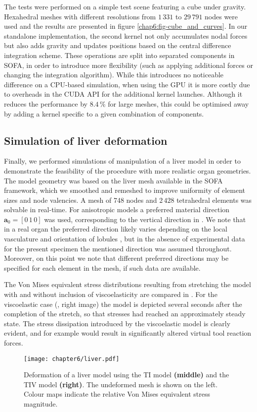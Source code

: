 The tests were performed on a simple test scene featuring a cube under gravity. Hexahedral meshes with different resolutions from $1\,331$ to $29\,791$ nodes were used and the results are presented in figure \ref{chap6:fig-cube_and_curves}. In our standalone implementation, the second kernel not only accumulates nodal forces but also adds gravity and updates positions based on the central difference integration scheme. These operations are split into separated components in SOFA, in order to introduce more flexibility (such as applying additional forces or changing the integration algorithm). While this introduces no noticeable difference on a CPU-based simulation, when using the GPU it is more costly due to overheads in the CUDA API for the additional kernel launches. Although it reduces the performance by $8.4\, \%$ for large meshes, this could be optimised away by adding a kernel specific to a given combination of components.
		
	
	\subsection{Simulation of liver deformation} \label{chap6:liverSimu}
Finally, we performed simulations of manipulation of a liver model in order to demonstrate the feasibility of the procedure with more realistic organ geometries. The model geometry was based on the liver mesh available in the SOFA framework, which we smoothed and remeshed to improve uniformity of element sizes and node valencies. A mesh of 748 nodes and $2\,428$ tetrahedral elements was solvable in real-time. For anisotropic models a preferred material direction $\mathbf{a}_0 = [0\, 1\, 0] $ was used, corresponding to the vertical direction in . We note that in a real organ the preferred direction likely varies depending on the local vasculature and orientation of lobules \citep{Chui07}, but in the absence of experimental data for the present specimen the mentioned direction was assumed throughout. Moreover, on this point we note that different preferred directions may be specified for each element in the mesh, if such data are available. 

\bigskip

The Von Mises equivalent stress distributions resulting from stretching the model with and without inclusion of viscoelasticity are compared in . For the viscoelastic case (, right image) the model is depicted several seconds after the completion of the stretch, so that stresses had reached an approximately steady state. The stress dissipation introduced by the viscoelastic model is clearly evident, and for example would result in significantly altered virtual tool reaction forces.	
%
\begin{figure}[h]
\begin{center}
\texttt{[image: chapter6/liver.pdf]}
\end{center}
\caption[GPU solution times]{Deformation of a liver model using the TI model \textbf{(middle)} and the TIV model \textbf{(right)}. The undeformed mesh is shown on the left. Colour maps indicate the relative Von Mises equivalent stress magnitude.} 
\label{chap6:fig-liver}
\end{figure}
	
